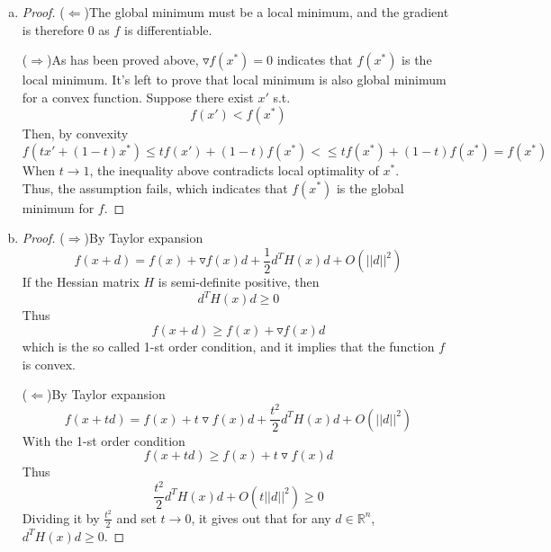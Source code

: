 \documentclass[paper=a4, fontsize=11pt]{scrartcl} %
\numberwithin{equation}{section} %
\numberwithin{figure}{section} %
\numberwithin{table}{section} %
\begin{document}
\begin{enumerate}[(a)]
\begin{proof}
			\end{proof}
		\item 
			\begin{proof}
				($\Leftarrow$)The global minimum must be a local minimum, and the gradient is therefore 0 as $f$ is differentiable.
				
				($\Rightarrow$)As has been proved above, $\triangledown f(x^*)=0$ indicates that $f(x^*)$ is the local minimum. It's left to prove that local minimum is also global minimum for a convex function.
				Suppose there exist $x'$ s.t. 
				\begin{equation}
					f(x') < f(x^*)
				\end{equation}
				Then, by convexity
				\begin{equation}
					f(t x' + (1-t)x^*) \leq t f(x') + (1-t) f(x^*) < \leq t f(x^*) + (1-t) f(x^*) = f(x^*)
				\end{equation}
				When $t\rightarrow1$, the inequality above contradicts local optimality of $x^*$.\\
				Thus, the assumption fails, which indicates that $f(x^*)$ is the global minimum for $f$.
				
			\end{proof}
		\item
			\begin{proof}
				($\Rightarrow$)By Taylor expansion
				\begin{equation}
					f(x+ d) = f(x) + \triangledown f(x) d + \frac{1}{2} d^T H(x) d + O(||d||^2)
				\end{equation}
				If the Hessian matrix $H$ is semi-definite positive, then
				\begin{equation}
					d^T H(x) d \geq 0
				\end{equation}
				Thus
				\begin{equation}
					f(x+ d) \geq f(x) + \triangledown f(x) d
				\end{equation}
				which is the so called 1-st order condition, and it implies that the function $f$ is convex.
				
				($\Leftarrow$)By Taylor expansion
				\begin{equation}
					f(x+ t d) = f(x) + t \triangledown f(x) d + \frac{t^2}{2} d^T H(x) d + O(||d||^2)
				\end{equation}
				With the 1-st order condition
				\begin{equation}
					f(x+ t d) \geq f(x) + t \triangledown f(x) d
				\end{equation}
				Thus
				\begin{equation}
					\frac{t^2}{2} d^T H(x) d + O(t||d||^2) \geq 0
				\end{equation}
				Dividing it by $\frac{t^2}{2}$ and set $t \rightarrow 0$, it gives out that for any $d\in \mathbb{R}^n$, $d^T H(x) d \geq 0$.
				
			\end{proof}
		
	\end{enumerate}
\end{document}
